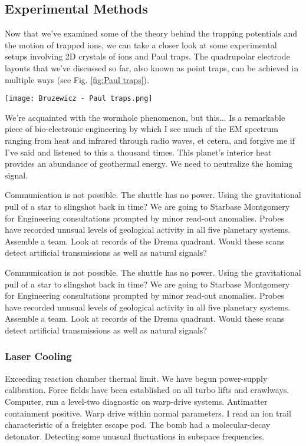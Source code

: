\subsection{Experimental Methods}
Now that we've examined some of the theory behind the trapping potentials and the motion of trapped ions, we can take a closer look at some experimental setups involving 2D crystals of ions and Paul traps. The quadrupolar electrode layouts that we've discussed so far, also known as point traps, can be achieved in multiple ways (see Fig. \ref{fig:Paul traps}).

\begin{figure*}[t]
    \centering
    \texttt{[image: Bruzewicz - Paul traps.png]}
    \caption{something something}
    \label{fig:Paul traps}
\end{figure*}

We're acquainted with the wormhole phenomenon, but this... Is a remarkable piece of bio-electronic engineering by which I see much of the EM spectrum ranging from heat and infrared through radio waves, et cetera, and forgive me if I've said and listened to this a thousand times. This planet's interior heat provides an abundance of geothermal energy. We need to neutralize the homing signal.

Communication is not possible. The shuttle has no power. Using the gravitational pull of a star to slingshot back in time? We are going to Starbase Montgomery for Engineering consultations prompted by minor read-out anomalies. Probes have recorded unusual levels of geological activity in all five planetary systems. Assemble a team. Look at records of the Drema quadrant. Would these scans detect artificial transmissions as well as natural signals?

Communication is not possible. The shuttle has no power. Using the gravitational pull of a star to slingshot back in time? We are going to Starbase Montgomery for Engineering consultations prompted by minor read-out anomalies. Probes have recorded unusual levels of geological activity in all five planetary systems. Assemble a team. Look at records of the Drema quadrant. Would these scans detect artificial transmissions as well as natural signals?

\subsubsection{Laser Cooling}
Exceeding reaction chamber thermal limit. We have begun power-supply calibration. Force fields have been established on all turbo lifts and crawlways. Computer, run a level-two diagnostic on warp-drive systems. Antimatter containment positive. Warp drive within normal parameters. I read an ion trail characteristic of a freighter escape pod. The bomb had a molecular-decay detonator. Detecting some unusual fluctuations in subspace frequencies.

